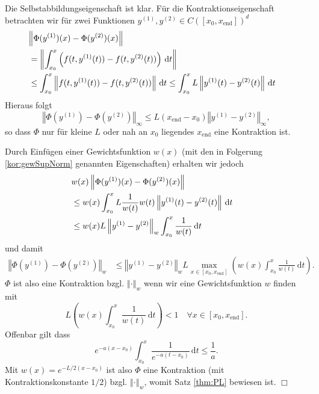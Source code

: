 \documentclass[12pt,a4paper]{book}
\theoremstyle{break}
\theoremstyle{nonumberplain}
\newcommand{\norm}[1]{\left\Vert#1\right\Vert}		%
\newcommand{\1}{\mathbbm{1}} 			      	%
\newcommand{\dx}[1][x]{\ensuremath{\, \mathrm{d} #1}} 	%
\begin{document}
Die Selbstabbildungseigenschaft ist klar. Für die Kontraktionseigenschaft betrachten wir
für zwei Funktionen $y^{(1)},y^{(2)}\in C([x_0,x_\mathrm{end}])^d$
\begin{align*}
\lefteqn{\norm{\Phi(y^{(1)})(x)-\Phi(y^{(2)})(x)}}\\
&=\norm{ \int_{x_0}^x \left( f(t,y^{(1)}(t)) - f(t,y^{(2)}(t)) \right)\dx[t]}\\
&\leq \int_{x_0}^x \norm{ f(t,y^{(1)}(t)) - f(t,y^{(2)}(t)) } \dx[t]
\leq \int_{x_0}^x L \norm{ y^{(1)}(t) - y^{(2)}(t) } \dx[t]
\end{align*}
Hieraus folgt 
\[
\norm{\Phi(y^{(1)}) - \Phi(y^{(2)}) }_\infty  \leq L (x_\mathrm{end}-x_0) \norm{y^{(1)} - y^{(2)}}_\infty,
\]
so dass $\Phi$ nur für kleine $L$ oder nah an $x_0$ liegendes $x_\mathrm{end}$ eine Kontraktion ist.

Durch Einfügen einer Gewichtsfunktion $w(x)$ (mit den in Folgerung \ref{kor:gewSupNorm} genannten Eigenschaften) erhalten wir jedoch
\begin{align*}
\lefteqn{w(x) \norm{\Phi(y^{(1)})(x)-\Phi(y^{(2)})(x)}}\\
&\leq w(x) \int_{x_0}^x L \frac{1}{w(t)} w(t) \norm{ y^{(1)}(t) - y^{(2)}(t) } \dx[t]\\
&\leq w(x) L \norm{y^{(1)} - y^{(2)}}_w \int_{x_0}^x \frac{1}{w(t)} \dx[t]
\end{align*}
und damit
\begin{align*}
\norm{\Phi(y^{(1)}) - \Phi(y^{(2)}) }_w&\leq \norm{y^{(1)} - y^{(2)}}_w
L \max_{x\in [x_0,x_\mathrm{end}]} \left(w(x) \int_{x_0}^x \frac{1}{w(t)} \dx[t]\right).
\end{align*}
$\Phi$ ist also eine Kontraktion bzgl. $\norm{\cdot}_w$ wenn wir eine Gewichtsfunktion 
$w$ finden mit
\[
L\left(w(x) \int_{x_0}^x \frac{1}{w(t)} \dx[t]\right)<1 \quad \forall x\in [x_0,x_\mathrm{end}].
\]
Offenbar gilt dass 
\[
e^{-a(x-x_0)} \int_{x_0}^x \frac{1}{e^{-a(t-x_0)}} \dx[t]\leq\frac{1}{a}.
\]
Mit $w(x)=e^{- L/2(x-x_0)}$ ist also $\Phi$ eine Kontraktion (mit Kontraktionskonstante $1/2$) 
bzgl. $\norm{\cdot}_w$, womit Satz \ref{thm:PL} bewiesen ist. \hfill $\Box$
\end{document}
